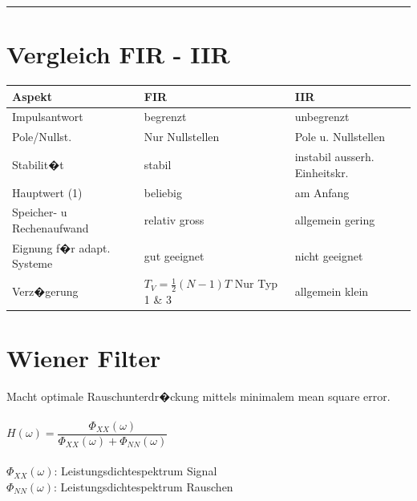 \vspace{0.25cm}
		
\hrule

\vspace{0.25cm}

    \begin{minipage}{9cm}
		\section{Vergleich FIR - IIR}
		\footnotesize
		\begin{tabular}{| p{2cm} | p{2.3cm} | p{2.5cm} |}
            \hline
            Aspekt & FIR & IIR \\
            \hline
            \hline
            Impulsantwort & begrenzt & unbegrenzt \\
            \hline
            Pole/Nullst. & Nur Nullstellen  & Pole u. Nullstellen  
            \\
            \hline
            Stabilit�t & stabil & instabil ausserh. Einheitskr.  
            \\
            \hline
            Hauptwert (1) & beliebig  & am Anfang
            \\
            \hline
            Speicher- u Rechenaufwand & relativ gross & allgemein gering  
            \\
            \hline
            Eignung f�r adapt. Systeme & gut geeignet & nicht geeignet  
            \\
            \hline
            Verz�gerung & $ T_V = \frac12 (N-1) T$ Nur Typ 1 \& 3 & allgemein klein 
            \\
            \hline
        \end{tabular}
 
    \end{minipage}
		\hfill
		\begin{minipage}{9cm}    	
		\section{Wiener Filter}
		Macht optimale Rauschunterdr�ckung mittels minimalem mean square error.\\ \\
		$H(\omega) = \dfrac{\Phi_{XX}(\omega)}{\Phi_{XX}(\omega)+\Phi_{NN}(\omega)}$\\
		\\ $\Phi_{XX}(\omega)$: Leistungsdichtespektrum Signal\\
		$\Phi_{NN}(\omega)$: Leistungsdichtespektrum Rauschen\\
		
    \end{minipage}